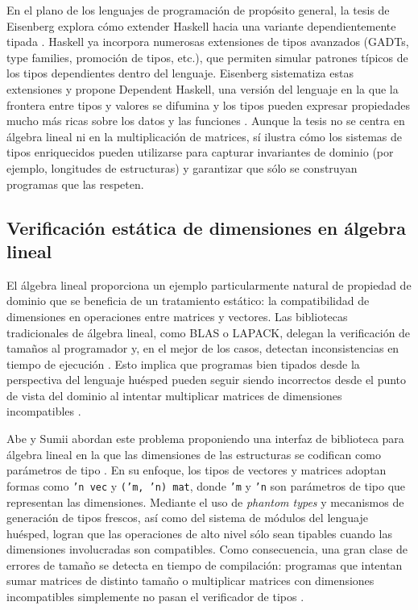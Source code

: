 \documentclass[conference]{IEEEtran}
\begin{document}
En el plano de los lenguajes de programación de propósito general, la tesis de Eisenberg explora cómo extender Haskell hacia una variante dependientemente tipada \cite{eisenberg2016}. Haskell ya incorpora numerosas extensiones de tipos avanzados (GADTs, type families, promoción de tipos, etc.), que permiten simular patrones típicos de los tipos dependientes dentro del lenguaje. Eisenberg sistematiza estas extensiones y propone Dependent Haskell, una versión del lenguaje en la que la frontera entre tipos y valores se difumina y los tipos pueden expresar propiedades mucho más ricas sobre los datos y las funciones \cite{eisenberg2016}. Aunque la tesis no se centra en álgebra lineal ni en la multiplicación de matrices, sí ilustra cómo los sistemas de tipos enriquecidos pueden utilizarse para capturar invariantes de dominio (por ejemplo, longitudes de estructuras) y garantizar que sólo se construyan programas que las respeten.

\subsection{Verificación estática de dimensiones en álgebra lineal}

El álgebra lineal proporciona un ejemplo particularmente natural de propiedad de dominio que se beneficia de un tratamiento estático: la compatibilidad de dimensiones en operaciones entre matrices y vectores. Las bibliotecas tradicionales de álgebra lineal, como BLAS o LAPACK, delegan la verificación de tamaños al programador y, en el mejor de los casos, detectan inconsistencias en tiempo de ejecución \cite{abe2015}. Esto implica que programas bien tipados desde la perspectiva del lenguaje huésped pueden seguir siendo incorrectos desde el punto de vista del dominio al intentar multiplicar matrices de dimensiones incompatibles \cite{abe2015}.


Abe y Sumii abordan este problema proponiendo una interfaz de biblioteca para álgebra lineal en la que las dimensiones de las estructuras se codifican como parámetros de tipo \cite{abe2015}. En su enfoque, los tipos de vectores y matrices adoptan formas como \texttt{'n vec} y \texttt{('m, 'n) mat}, donde \texttt{'m} y \texttt{'n} son parámetros de tipo que representan las dimensiones. Mediante el uso de \emph{phantom types} y mecanismos de generación de tipos frescos, así como del sistema de módulos del lenguaje huésped, logran que las operaciones de alto nivel sólo sean tipables cuando las dimensiones involucradas son compatibles. Como consecuencia, una gran clase de errores de tamaño se detecta en tiempo de compilación: programas que intentan sumar matrices de distinto tamaño o multiplicar matrices con dimensiones incompatibles simplemente no pasan el verificador de tipos \cite{abe2015}.
\end{document}
